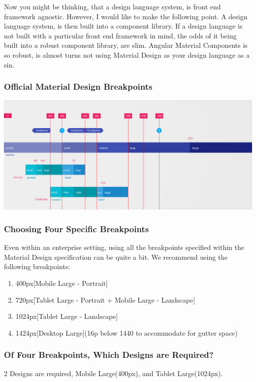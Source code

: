 Now you might be thinking, that a design language system, is front end framework
agnostic. However, I would like to make the following point. A design language
system, is then built into a component library. If a design language is not
built with a particular front end framework in mind, the odds of it being
built into a robust component library, are slim. Angular Material Components is
so robust, is almost turns not using Material Design as your design language as
a sin.

\subsubsection{ Official Material Design Breakpoints }
\includegraphics[scale=0.15]{pwa/responsive/layout-adaptive-breakpoints}

\subsubsection{ Choosing Four Specific Breakpoints }
Even within an enterprise setting, using all the breakpoints specified within
the Material Design specification can be quite a bit. We recommend using the
following breakpoints:

\begin{enumerate}
  \item 400px[Mobile Large - Portrait]
  \item 720px[Tablet Large - Portrait + Mobile Large - Landscape]
  \item 1024px[Tablet Large - Landscape]
  \item 1424px[Desktop Large](16p below 1440 to accommodate for gutter space)
\end{enumerate}

\subsubsection{ Of Four Breakpoints, Which Designs are Required? }
2 Designs are required, Mobile Large(400px), and Tablet Large(1024px).

